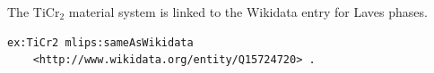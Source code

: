 The TiCr$_2$ material system is linked to the Wikidata entry for Laves phases.
\begin{lstlisting}[language=turtle]
ex:TiCr2 mlips:sameAsWikidata
    <http://www.wikidata.org/entity/Q15724720> .
\end{lstlisting}
